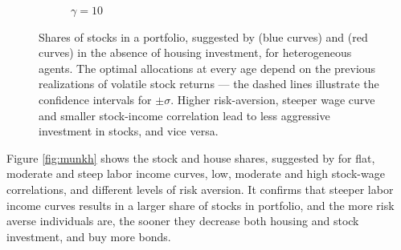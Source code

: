 \documentclass[]{elsarticle}
\begin{document}
\begin{figure}[H]
\begin{subfigure}{0.45\textwidth}
		\caption{$\gamma = 10$}
	\end{subfigure}
	\caption{Shares of stocks in a portfolio, suggested by \citet{bodie} (blue curves) and \citet{munk} (red curves) in the absence of housing investment, for heterogeneous agents. The optimal allocations at every age depend on the previous realizations of volatile stock returns --- the dashed lines illustrate the confidence intervals for $\pm \sigma$. Higher risk-aversion, steeper wage curve and smaller stock-income correlation lead to less aggressive investment in stocks, and vice versa. }
	\label{fig:individs}
\end{figure}


Figure \ref{fig:munkh} shows the stock and house shares, suggested by \citet{munk} for flat, moderate and steep labor income curves, low, moderate and high stock-wage correlations, and different levels of risk aversion. It confirms that steeper labor income curves results in a larger share of stocks in portfolio, and the more risk averse individuals are, the sooner they decrease both housing and stock investment, and buy more bonds.
\end{document}
